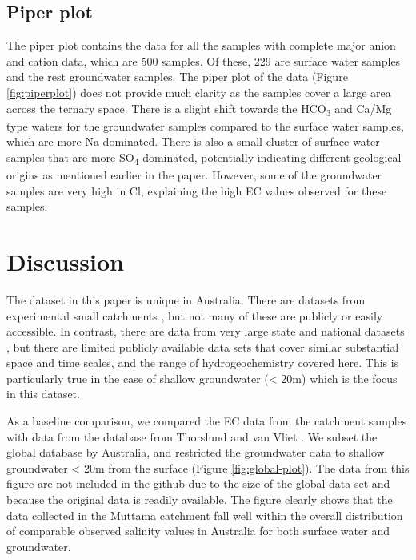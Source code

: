 \documentclass[, manuscript]{copernicus}
\begin{document}
\subsection{Piper plot}

The piper plot contains the data for all the samples with complete major
anion and cation data, which are 500 samples. Of these, 229 are surface
water samples and the rest groundwater samples. The piper plot of the
data (Figure \ref{fig:piperplot}) does not provide much clarity as the
samples cover a large area across the ternary space. There is a slight
shift towards the HCO\textsubscript{3} and Ca/Mg type waters for the
groundwater samples compared to the surface water samples, which are
more Na dominated. There is also a small cluster of surface water
samples that are more SO\textsubscript{4} dominated, potentially
indicating different geological origins as mentioned earlier in the
paper. However, some of the groundwater samples are very high in Cl,
explaining the high EC values observed for these samples.

\section{Discussion}

The dataset in this paper is unique in Australia. There are datasets
from experimental small catchments
\citep[i.e.][]{Hughes2007, crosbie2007, Summerell2006}, but not many of
these are publicly or easily accessible. In contrast, there are data
from very large state and national datasets
\citep[i.e.][]{Jolly2001, thorslund_vanvliet2020}, but there are limited
publicly available data sets that cover similar substantial space and
time scales, and the range of hydrogeochemistry covered here. This is
particularly true in the case of shallow groundwater (\textless{} 20m)
which is the focus in this dataset.

As a baseline comparison, we compared the EC data from the catchment
samples with data from the database from Thorslund and van Vliet
\citeyearpar{thorslund_vanvliet2020}. We subset the global database by
Australia, and restricted the groundwater data to shallow groundwater
\textless{} 20m from the surface (Figure \ref{fig:global-plot}). The
data from this figure are not included in the github due to the size of
the global data set and because the original data is readily available.
The figure clearly shows that the data collected in the Muttama
catchment fall well within the overall distribution of comparable
observed salinity values in Australia for both surface water and
groundwater.
\end{document}

